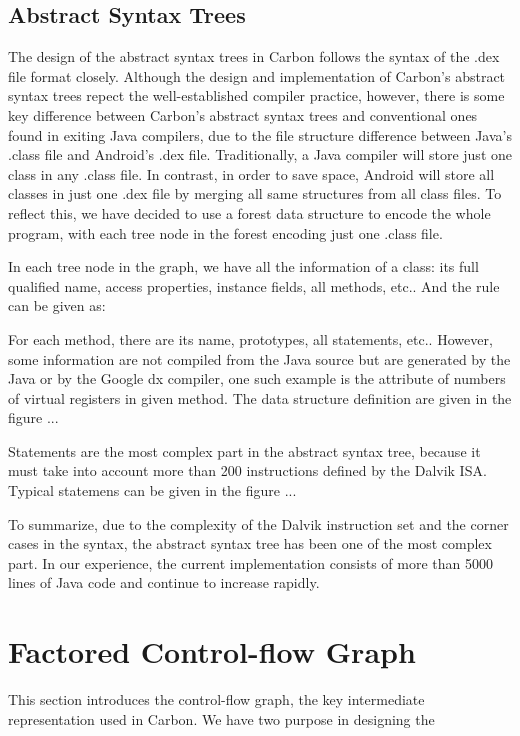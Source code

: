 \documentclass[preprint, cm]{sigplanconf}
\begin{document}
\subsection{Abstract Syntax Trees}
The design of the abstract syntax trees in Carbon follows
the syntax of the .dex file format closely. Although the
design and implementation of Carbon's abstract syntax trees
repect the well-established compiler practice, however, there is
some key difference between Carbon's abstract syntax trees and
conventional ones found in exiting Java compilers, due to the file
structure difference between Java's .class file and Android's
.dex file. Traditionally, a Java compiler will store just
one class in any .class file. In contrast, in order to save
space, Android will store all classes in just one .dex file
by merging all same structures from all class files. To reflect
this, we have decided to use a forest data structure to
encode the whole program, with
each tree node in the forest encoding just one .class 
file. 

In each tree node in the graph, we have all the information
of a class: its full qualified name, access properties, 
instance fields, all methods, etc.. And the rule can
be given as:


For each method, there are its name, prototypes, all
statements, etc.. However, some information are not
compiled from the Java source but are generated by
the Java or by the Google dx compiler, one such example is
the attribute of numbers of virtual registers in given method. The
data structure definition are given in the figure ...

Statements are the most complex part in the abstract
syntax tree, because it must take into account more than
200 instructions defined by the Dalvik ISA. Typical
statemens can be given in the figure ...

To summarize, due to the complexity of the Dalvik instruction set
and the corner cases in the syntax, the abstract syntax
tree has been one of the most complex part. In our
experience, the current implementation consists of 
more than 5000 lines of Java code and continue to
increase rapidly.


\section{Factored Control-flow Graph}\label{sec-cfg}
This section introduces the control-flow graph, the key
intermediate representation used in Carbon. We have two
purpose in designing the 
\end{document}
